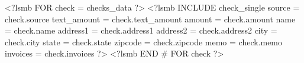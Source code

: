 \documentclass{scrartcl}
\begin{document}
\pagestyle{myheadings}
\thispagestyle{empty}

\fontsize{9pt}{9pt}\selectfont
<?lsmb FOR check = checks_data ?>
<?lsmb INCLUDE check_single 
	source = check.source
	text_amount = check.text_amount
	amount = check.amount
	name = check.name
	address1 = check.address1
	address2 = check.address2
	city = check.city
	state = check.state
	zipcode = check.zipcode
	memo = check.memo
	invoices = check.invoices
?>
\endpage
<?lsmb END # FOR check ?>
\end{document}
